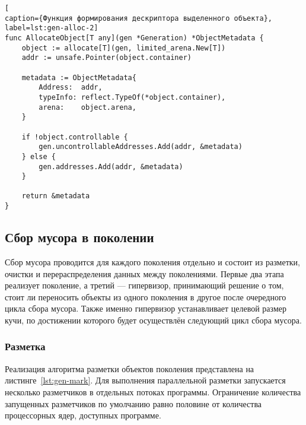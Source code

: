 \clearpage
\begin{lstlisting}[
caption={Функция формирования дескриптора выделенного объекта},
label=lst:gen-alloc-2]
func AllocateObject[T any](gen *Generation) *ObjectMetadata {
	object := allocate[T](gen, limited_arena.New[T])
	addr := unsafe.Pointer(object.container)
	
	metadata := ObjectMetadata{
		Address:  addr,
		typeInfo: reflect.TypeOf(*object.container),
		arena:    object.arena,
	}
	
	if !object.controllable {
		gen.uncontrollableAddresses.Add(addr, &metadata)
	} else {
		gen.addresses.Add(addr, &metadata)
	}
	
	return &metadata
}
\end{lstlisting}



\subsection{Сбор мусора в поколении}

Сбор мусора проводится для каждого поколения отдельно и состоит из разметки, очистки и перераспределения данных между поколениями. Первые два этапа реализует поколение, а третий --- гипервизор, принимающий решение о том, стоит ли переносить объекты из одного поколения в другое после очередного цикла сбора мусора. Также именно гипервизор устанавливает целевой размер кучи, по достижении которого будет осуществлён следующий цикл сбора мусора.

\subsubsection{Разметка}

Реализация алгоритма разметки объектов поколения представлена на листинге~\ref{lst:gen-mark}. Для выполнения параллельной разметки запускается несколько разметчиков в отдельных потоках программы. Ограничение количества запущенных разметчиков по умолчанию равно половине от количества процессорных ядер, доступных программе.


